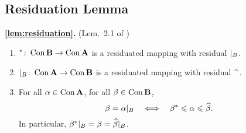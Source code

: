 \subsection{Residuation Lemma}
\label{sec:residuation-lemma-1}
\begin{lem}{\bf\ref{lem:residuation}.} (Lem.~2.1 of \cite{overalgebras})\
\begin{enumerate}[\rm(i)]
  \item \label{item:residlemma-i} $^*\colon \operatorname{Con}\mathbf{B} \rightarrow \operatorname{Con}\mathbf{A}$ is a residuated mapping with
    residual $|_B$.
  \item \label{item:residlemma-ii} $|_B \colon  \operatorname{Con}\mathbf{A} \rightarrow \operatorname{Con}\mathbf{B}$ is a residuated mapping with
    residual $\hatmap$.
\item \label{item:residlemma-iii} For all $\alpha \in \operatorname{Con}\mathbf{A}$, for all $\beta \in \operatorname{Con}\mathbf{B}$,
\[
\beta = \alpha|_B \quad \Longleftrightarrow  \quad
\beta^* \leqslant \alpha \leqslant \widehat{\beta}.
\]
In particular,
$\beta^*|_B = \beta = \widehat{\beta}|_B$.
  \end{enumerate}
\end{lem}
